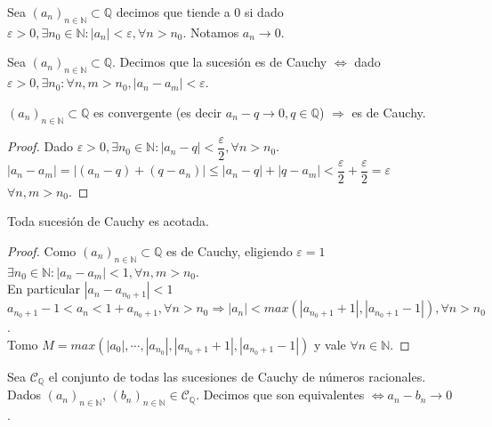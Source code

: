 Sea $(a_n)_{n \in \mathbb{N}} \subset \mathbb{Q}$ decimos que tiende a 0 si dado $\varepsilon > 0, \exists n_0 \in \mathbb{N} : |a_n| < \varepsilon, \forall n > n_0$.
Notamos $a_n \to 0$.

\begin{definition}
  Sea $(a_n)_{n \in \mathbb{N}} \subset \mathbb{Q}$. Decimos que la sucesión es de Cauchy $\iff$ dado $\varepsilon > 0, \exists n_0 : \forall n,m > n_0, |a_n - a_m| < \varepsilon$.
\end{definition}

\begin{theorem}
  $(a_n)_{n \in \mathbb{N}} \subset \mathbb{Q}$ es convergente (es decir $a_n - q \to 0, q \in \mathbb{Q}$) $\Rightarrow$ es de Cauchy.
  \begin{proof}
    Dado $\varepsilon > 0, \exists n_0 \in \mathbb{N} : |a_n - q| < \dfrac{\varepsilon}{2}, \forall n > n_0$. \\
    $|a_n - a_m| = |(a_n - q) + (q - a_n)| \leq |a_n - q| + |q - a_m| < \dfrac{\varepsilon}{2} + \dfrac{\varepsilon}{2} = \varepsilon$ \\
    $\forall n,m > n_0$.
  \end{proof}
\end{theorem}

\begin{theorem}
  Toda sucesión de Cauchy es acotada.

  \begin{proof}
    Como $(a_n)_{n \in \mathbb{N}} \subset \mathbb{Q}$ es de Cauchy, eligiendo $\varepsilon = 1$ \\
    $\exists n_0 \in \mathbb{N} : |a_n - a_m| < 1, \forall n,m > n_0$. \\
    En particular $|a_n - a_{n_0+1}| < 1$ \\
    $a_{n_0+1} - 1 < a_n < 1 + a_{n_0+1}, \forall n > n_0 \Rightarrow |a_n| < max(|a_{n_0+1} + 1|, |a_{n_0+1} - 1|), \forall n > n_0$. \\
    Tomo $M = max(|a_0|, \cdots, |a_{n_0}|, |a_{n_0+1} + 1|, |a_{n_0+1} - 1|)$ y vale $\forall n \in \mathbb{N}$.
  \end{proof}
\end{theorem}

\begin{definition}
  Sea $\mathscr{C}_{\mathbb{Q}}$ el conjunto de todas las sucesiones de Cauchy de números racionales. Dados $(a_n)_{n \in \mathbb{N}}$, $(b_n)_{n \in \mathbb{N}} \in \mathscr{C}_{\mathbb{Q}}$. Decimos que son equivalentes $\iff a_n - b_n \to 0$.
\end{definition}

